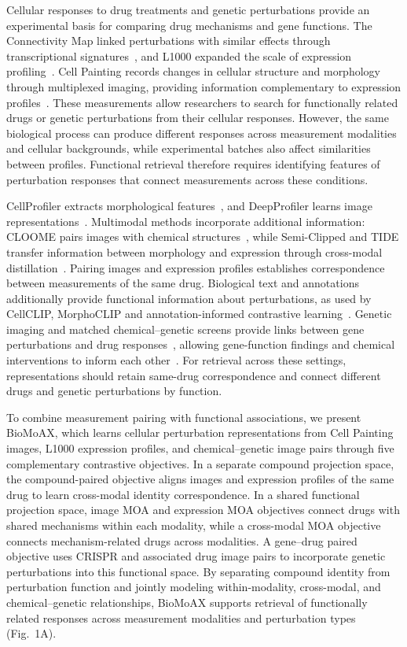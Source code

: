 Cellular responses to drug treatments and genetic perturbations provide an experimental basis for comparing drug mechanisms and gene functions. The Connectivity Map linked perturbations with similar effects through transcriptional signatures~\cite{lamb2006}, and L1000 expanded the scale of expression profiling~\cite{subramanian2017}. Cell Painting records changes in cellular structure and morphology through multiplexed imaging, providing information complementary to expression profiles~\cite{bray2016,way2022}. These measurements allow researchers to search for functionally related drugs or genetic perturbations from their cellular responses. However, the same biological process can produce different responses across measurement modalities and cellular backgrounds, while experimental batches also affect similarities between profiles. Functional retrieval therefore requires identifying features of perturbation responses that connect measurements across these conditions.

CellProfiler extracts morphological features~\cite{stirling2021}, and DeepProfiler learns image representations~\cite{moshkov2024}. Multimodal methods incorporate additional information: CLOOME pairs images with chemical structures~\cite{sanchez2023}, while Semi-Clipped and TIDE transfer information between morphology and expression through cross-modal distillation~\cite{bendidi2025,chen2026}. Pairing images and expression profiles establishes correspondence between measurements of the same drug. Biological text and annotations additionally provide functional information about perturbations, as used by CellCLIP, MorphoCLIP and annotation-informed contrastive learning~\cite{lu2025,ilyosbekov2026,pwesombo2025}. Genetic imaging and matched chemical--genetic screens provide links between gene perturbations and drug responses~\cite{rohban2017,chandrasekaran2024}, allowing gene-function findings and chemical interventions to inform each other~\cite{li2026unipert}. For retrieval across these settings, representations should retain same-drug correspondence and connect different drugs and genetic perturbations by function.

To combine measurement pairing with functional associations, we present BioMoAX, which learns cellular perturbation representations from Cell Painting images, L1000 expression profiles, and chemical--genetic image pairs through five complementary contrastive objectives. In a separate compound projection space, the compound-paired objective aligns images and expression profiles of the same drug to learn cross-modal identity correspondence. In a shared functional projection space, image MOA and expression MOA objectives connect drugs with shared mechanisms within each modality, while a cross-modal MOA objective connects mechanism-related drugs across modalities. A gene--drug paired objective uses CRISPR and associated drug image pairs to incorporate genetic perturbations into this functional space. By separating compound identity from perturbation function and jointly modeling within-modality, cross-modal, and chemical--genetic relationships, BioMoAX supports retrieval of functionally related responses across measurement modalities and perturbation types (Fig.~1A).


